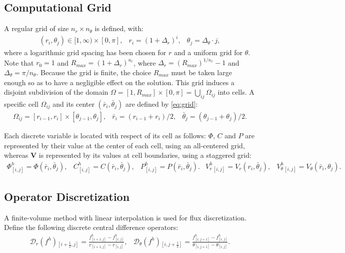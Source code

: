 \documentclass[10pt]{ijnam}
\newcommand{\pars}[1]{\left(#1\right)}
\newcommand{\half}{\frac{1}{2}}
\newcommand\bV{\boldsymbol{V}}
\newcommand\cD{\mathcal{D}}
\begin{document}
\subsection{Computational Grid}
A regular grid of size $n_r \times n_\theta$ is defined, with:
\begin{eqnarray} \label{eq:grid}
(r_i,\theta_j) \in [1, \infty) \times [0,\pi], & 
r_i = (1+\Delta_r)^i, &
 \theta_j = \Delta_\theta \cdot j,
\end{eqnarray}
where a logarithmic grid spacing has been chosen for $r$ and a uniform grid for $\theta$.
Note that $r_0 = 1$ and $R_{max} = (1+\Delta_r)^{n_r}$, where
$\Delta_r = \pars{R_{max}} ^ {1/n_r} - 1$ and $\Delta_\theta = {\pi/n_\theta}$.
Because the grid is finite, the choice 
$R_{max}$ must be taken large enough so as to have a negligible effect
on the solution.
This grid induces a disjoint subdivision of the domain 
$\Omega = [1, R_{max}] \times [0,\pi] = \bigcup_{ij}\Omega_{ij}$ into cells.
A specific cell $\Omega_{ij}$ and its center $(\bar{r}_i, \bar{\theta}_j)$ are defined by \eqref{eq:grid}:
\begin{eqnarray}
\Omega_{ij} = [r_{i-1}, r_{i}] \times [\theta_{j-1}, \theta_{j}], &
\bar{r}_i = (r_{i-1} + r_{i})/2, &
\bar{\theta}_j = (\theta_{j-1} + \theta_{j})/2.
\end{eqnarray}

Each discrete variable is located with respect of its cell as follows:
$\varPhi$, $C$ and $P$ are represented by their value at the center of each cell, 
using an all-centered grid, whereas $\bV$ is represented by its values at cell 
boundaries, using a staggered grid:
\begin{equation}
\begin{array}{ccccc}
\varPhi^h_{[i,j]} = \varPhi(\bar{r}_i, \bar{\theta}_j), &
C^h_{[i,j]} = C(\bar{r}_i, \bar{\theta}_j), &
P^h_{[i,j]} = P(\bar{r}_i, \bar{\theta}_j). &
V_r^h{}_{[i,j]} = V_r(r_i, \bar{\theta}_j), &
V_\theta^h{}_{[i,j]} = V_\theta(\bar{r}_i, {\theta}_j).
\end{array}
\end{equation}

\subsection{Operator Discretization} 
A finite-volume method with linear interpolation is used for flux discretization. 
Define the following discrete central difference operators:
\begin{eqnarray} \label{eq:disc_diff}
\cD_r(f^h){}_{\left[i+\half,j\right]} = \frac{f^h_{\left[i+1,j\right]} - f^h_{\left[i,j\right]}}
                       {r_{\left[i+1,j\right]} - r_{\left[i,j\right]}}, &
\cD_\theta(f^h){}_{\left[i,j+\half\right]} = \frac{f^h_{\left[i,j+1\right]} - f^h_{\left[i,j\right]}}
					   {\theta_{\left[i,j+1\right]} - \theta_{\left[i,j\right]}}.
\end{eqnarray}
\end{document}
